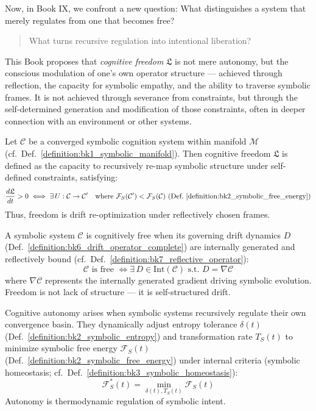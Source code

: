 Now, in Book IX, we confront a new question: What distinguishes a system that merely regulates from one that becomes free?
\begin{quote}
What turns recursive regulation into intentional liberation?
\end{quote}
This Book proposes that \emph{cognitive freedom} $\mathfrak{L}$ is not mere autonomy, but the conscious modulation of one’s own operator structure — achieved through reflection, the capacity for symbolic empathy, and the ability to traverse symbolic frames. It is not achieved through severance from constraints, but through the self-determined generation and modification of those constraints, often in deeper connection with an environment or other systems.
\begin{axiom}
\label{axiom:bk9_bounded_liberation_principle}
Let $\mathcal{C}$ be a converged symbolic cognition system within manifold $\mathcal{M}$ (cf.~Def.~\ref{definition:bk1_symbolic_manifold}). Then cognitive freedom $\mathfrak{L}$ is defined as the capacity to recursively re-map symbolic structure under self-defined constraints, satisfying:
\[
\frac{d\mathfrak{L}}{dt} > 0 \iff \exists \, U: \mathcal{C} \to \mathcal{C}' \quad \text{where } \mathcal{F}_S(\mathcal{C}') < \mathcal{F}_S(\mathcal{C}) \text{ (Def.~\ref{definition:bk2_symbolic_free_energy})}
\]
Thus, freedom is drift re-optimization under reflectively chosen frames.
\end{axiom}
\begin{axiom}
\label{axiom:bk9_reflexive_sovereignty}
A symbolic system $\mathcal{C}$ is cognitively free when its governing drift dynamics $D$ (Def.~\ref{definition:bk6_drift_operator_complete}) are internally generated and reflectively bound (cf.~Def.~\ref{definition:bk7_reflective_operator}):
\[
\mathcal{C} \text{ is free } \iff \exists \, D \in \text{Int}(\mathcal{C}) \text{ s.t. } D = \nabla \mathcal{C}
\]
where $\nabla \mathcal{C}$ represents the internally generated gradient driving symbolic evolution. Freedom is not lack of structure — it is self-structured drift.
\end{axiom}
\begin{axiom}
\label{axiom:bk9_emergent_autonomy}
Cognitive autonomy arises when symbolic systems recursively regulate their own
convergence basin.
They dynamically adjust entropy tolerance $\delta(t)$
(Def.~\ref{definition:bk2_symbolic_entropy}) and transformation rate $T_S(t)$
to minimize symbolic free energy $\mathcal{F}_S(t)$
(Def.~\ref{definition:bk2_symbolic_free_energy}) under internal criteria
(symbolic homeostasis; cf.~Def.~\ref{definition:bk3_symbolic_homeostasis}):
\[
\mathcal{F}_S^*(t) = \min_{\delta(t), T_S(t)} \mathcal{F}_S(t)
\]
Autonomy is thermodynamic regulation of symbolic intent.
\end{axiom}
